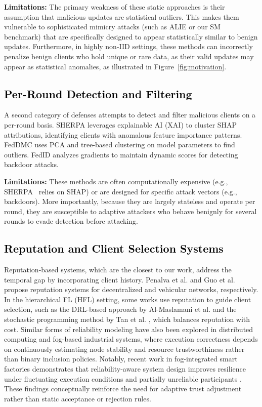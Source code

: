 \documentclass[lettersize,journal]{IEEEtran}
\begin{document}
\textbf{Limitations:} The primary weakness of these static approaches is their assumption that malicious updates are statistical outliers. This makes them vulnerable to sophisticated mimicry attacks (such as ALIE \cite{baruch2019littleenoughcircumventingdefenses} or our SM benchmark) that are specifically designed to appear statistically similar to benign updates. Furthermore, in highly non-IID settings, these methods can incorrectly penalize benign clients who hold unique or rare data, as their valid updates may appear as statistical anomalies, as illustrated in Figure~\ref{fig:motivation}.


\subsection{\textcolor{black}{Per-Round Detection and Filtering}}
A second category of defenses attempts to detect and filter malicious clients on a per-round basis. SHERPA \cite{sandeepa2024sherpa} leverages explainable AI (XAI) to cluster SHAP attributions, identifying clients with anomalous feature importance patterns. FedDMC \cite{mu2024feddmc} uses PCA and tree-based clustering on model parameters to find outliers. FedID \cite{huang2025fedid} analyzes gradients to maintain dynamic scores for detecting backdoor attacks.

\textbf{Limitations:} These methods are often computationally expensive (e.g., SHERPA~\cite{sandeepa2024sherpa} relies on SHAP) or are designed for specific attack vectors (e.g., backdoors). More importantly, because they are largely stateless and operate per round, they are susceptible to adaptive attackers who behave benignly for several rounds to evade detection before attacking.


\subsection{\textcolor{black}{Reputation and Client Selection Systems}}
Reputation-based systems, which are the closest to our work, address the temporal gap by incorporating client history. Penalva et al. \cite{penalva2025repunet} and Guo et al. \cite{guo2025reputation} propose reputation systems for decentralized and vehicular networks, respectively. In the hierarchical FL (HFL) setting, some works use reputation to guide client selection, such as the DRL-based approach by Al-Maslamani et al. \cite{al2023reputation} and the stochastic programming method by Tan et al. \cite{tan2022reputation}, which balances reputation with cost.
Similar forms of reliability modeling have also been explored in distributed computing and fog-based industrial systems, where execution correctness depends on continuously estimating node stability and resource trustworthiness rather than binary inclusion policies. Notably, recent work in fog-integrated smart factories demonstrates that reliability-aware system design improves resilience under fluctuating execution conditions and partially unreliable participants \cite{DEHNAVI20191}.
 These findings conceptually reinforce the need for adaptive trust adjustment rather than static acceptance or rejection rules.
\end{document}
